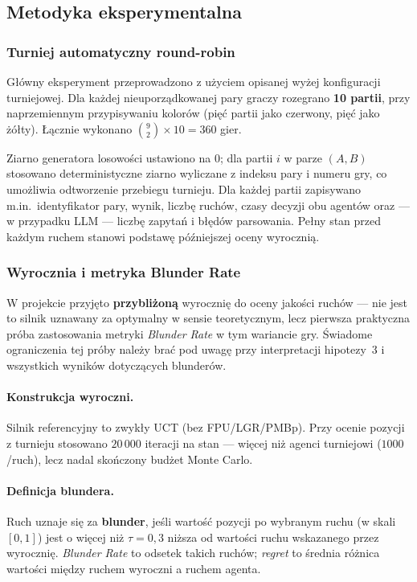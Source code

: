 \documentclass[11pt, a4paper]{article}
\begin{document}
\subsection{Metodyka eksperymentalna}
\label{sec:metodyka}

\subsubsection{Turniej automatyczny round-robin}

Główny eksperyment przeprowadzono z użyciem opisanej wyżej konfiguracji turniejowej. Dla każdej nieuporządkowanej pary graczy rozegrano \textbf{10 partii}, przy naprzemiennym przypisywaniu kolorów (pięć partii jako czerwony, pięć jako żółty). Łącznie wykonano $ \binom{9}{2} \times 10 = 360$ gier.

Ziarno generatora losowości ustawiono na $0$; dla partii $i$ w parze $(A, B)$ stosowano deterministyczne ziarno wyliczane z indeksu pary i numeru gry, co umożliwia odtworzenie przebiegu turnieju. Dla każdej partii zapisywano m.in.\ identyfikator pary, wynik, liczbę ruchów, czasy decyzji obu agentów oraz --- w przypadku LLM --- liczbę zapytań i błędów parsowania. Pełny stan przed każdym ruchem stanowi podstawę późniejszej oceny wyrocznią.

\subsubsection{Wyrocznia i metryka Blunder Rate}
\label{sec:wyrocznia}

W projekcie przyjęto \textbf{przybliżoną} wyrocznię do oceny jakości ruchów --- nie jest to silnik uznawany za optymalny w sensie teoretycznym, lecz pierwsza praktyczna próba zastosowania metryki \textit{Blunder Rate} w tym wariancie gry. Świadome ograniczenia tej próby należy brać pod uwagę przy interpretacji hipotezy~3 i wszystkich wyników dotyczących blunderów.

\paragraph{Konstrukcja wyroczni.}
Silnik referencyjny to zwykły UCT (bez FPU/LGR/PMBp). Przy ocenie pozycji z turnieju stosowano $20\,000$ iteracji na stan --- więcej niż agenci turniejowi ($1000$/ruch), lecz nadal skończony budżet Monte Carlo.

\paragraph{Definicja blundera.}
Ruch uznaje się za \textbf{blunder}, jeśli wartość pozycji po wybranym ruchu (w skali $[0,1]$) jest o więcej niż $\tau = 0{,}3$ niższa od wartości ruchu wskazanego przez wyrocznię. \textit{Blunder Rate} to odsetek takich ruchów; \textit{regret} to średnia różnica wartości między ruchem wyroczni a ruchem agenta.
\end{document}
